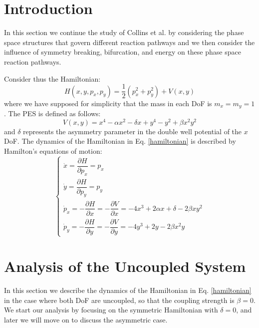 \documentclass[10pt,aps,onecolumn,superscriptaddress]{revtex4-2}
\begin{document}
\maketitle



\section{Introduction}


In this section we continue the study of Collins et al. \cite{collins2011} by considering the phase space structures that govern different reaction pathways and we  then consider the influence of symmetry breaking, bifurcation, and energy on these phase space reaction pathways.

Consider thus the Hamiltonian:
\begin{equation}
H(x,y,p_x,p_y) = \frac{1}{2}\left(p_x^2 + p_y^2\right) + V(x,y)
\label{hamiltonian}
\end{equation}
where we have supposed for simplicity that the mass in each DoF is $m_x = m_y = 1$. The PES is defined as follows:
\begin{equation}
V(x,y) = x^4 - \alpha x^2 - \delta x + y^4 - y^2 + \beta x^2 y^2
\label{pes_model}
\end{equation}
and $\delta$ represents the asymmetry parameter in the double well potential of the $x$ DoF. The dynamics of the Hamiltonian in Eq. \eqref{hamiltonian} is described by Hamilton's equations of motion:
\begin{equation}
\begin{cases}
\dot{x} = \dfrac{\partial H}{\partial p_x} = p_x \\[.4cm]
\dot{y} = \dfrac{\partial H}{\partial p_y} = p_y \\[.4cm]
\dot{p}_x = -\dfrac{\partial H}{\partial x} = -\dfrac{\partial V}{\partial x} = -4 x^3 + 2 \alpha x + \delta - 2 \beta x y^2 \\[.4cm]
\dot{p}_y = -\dfrac{\partial H}{\partial y} = -\dfrac{\partial V}{\partial y} = -4 y^3 + 2 y - 2 \beta x^2 y
\end{cases}
\label{ham_eqs}
\end{equation}

\section{Analysis of the Uncoupled System}
\label{sec:sec2}
In this section we describe the dynamics of the Hamiltonian in Eq. \eqref{hamiltonian} in the case where both DoF are uncoupled, so that the coupling strength is $\beta = 0$. We start our analysis by focusing on the symmetric Hamiltonian with $\delta = 0$, and later we will move on to discuss the asymmetric case. 
\end{document}
